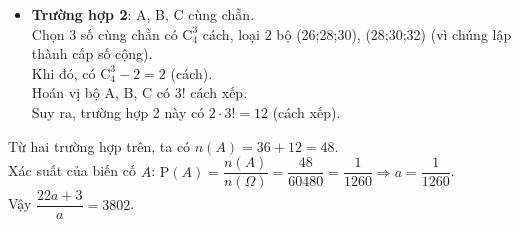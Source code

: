 \begin{ex}
{\begin{itemize}
		Khi đó, có $\mathrm{C}_5^3-4=6$ (cách).\\
		Hoán vị bộ A, B, C có $3!$ cách xếp.\\
		Suy ra, trường hợp 1 này có $6\cdot 3!=36$ (cách xếp).
		\item \textbf{Trường hợp 2}: A, B, C cùng chẵn.\\
		Chọn $3$ số cùng chẵn có $\mathrm{C}_4^3$ cách, loại $2$ bộ (26;28;30), (28;30;32) (vì chúng lập thành cấp số cộng).\\
		Khi đó, có $\mathrm{C}_4^3-2=2$ (cách).\\
		Hoán vị bộ A, B, C có $3!$ cách xếp.\\
		Suy ra, trường hợp 2 này có $2\cdot 3!=12$ (cách xếp).
	\end{itemize}
	Từ hai trường hợp trên, ta có $n(A)=36+12=48$.\\
	Xác suất của biến cố $A$: $\mathrm{P}(A)=\dfrac{n(A)}{n(\Omega)}=\dfrac{48}{60480}=\dfrac{1}{1260}\Rightarrow a=\dfrac{1}{1260}$.\\
	Vậy $\dfrac{22a + 3}{a}=3802$.
	}
\end{ex}

